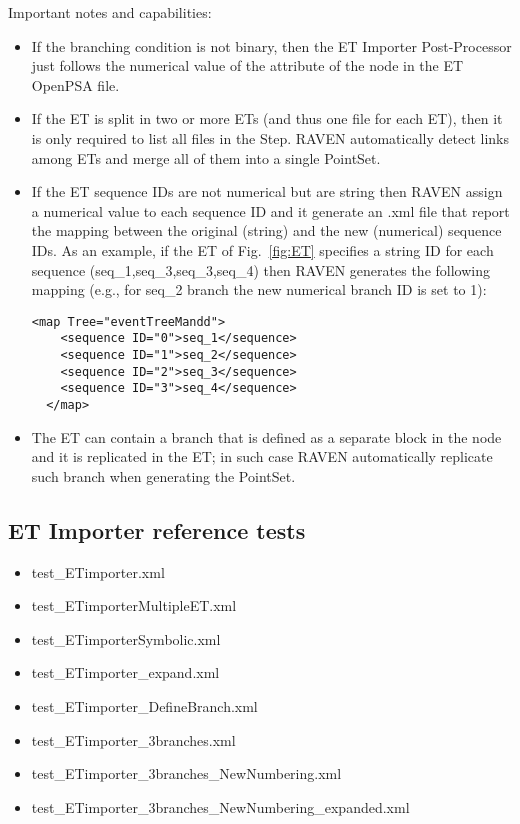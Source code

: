 Important notes and capabilities:
\begin{itemize}
	\item If the branching condition is not binary, then the ET Importer Post-Processor just follows 
	      the numerical value of the  attribute of the  node in the ET OpenPSA file. 
	\item If the ET is split in two or more ETs (and thus one file for each ET), then it is only required to list 
	      all files in the Step. RAVEN automatically detect links among ETs and merge all of them into a single PointSet.
	\item If the ET sequence IDs are not numerical but are string then RAVEN assign a numerical value to each sequence ID
	      and it generate an .xml file that report the mapping between the original (string) and the new (numerical) 
	      sequence IDs. As an example, if the ET of Fig.~\ref{fig:ET} specifies a string ID for each sequence 
	      (seq\_1,seq\_3,seq\_3,seq\_4) then RAVEN generates the following mapping (e.g., for seq\_2 branch the new 
	      numerical branch ID is set to 1):
\begin{lstlisting}[style=XML,morekeywords={anAttribute},caption=ET Importer mapping., label=lst:ET_PP_mapping]
  <map Tree="eventTreeMandd">
    <sequence ID="0">seq_1</sequence>
    <sequence ID="1">seq_2</sequence>
    <sequence ID="2">seq_3</sequence>
    <sequence ID="3">seq_4</sequence>
  </map>
\end{lstlisting}
    \item The ET can contain a branch that is defined as a separate block in the  node and it is 
          replicated in the ET; in such case RAVEN automatically replicate such branch when generating the PointSet. 
\end{itemize}
 

\subsection{ET Importer reference tests}
\begin{itemize}
	\item test\_ETimporter.xml
	\item test\_ETimporterMultipleET.xml
	\item test\_ETimporterSymbolic.xml
	\item test\_ETimporter\_expand.xml
	\item test\_ETimporter\_DefineBranch.xml
	\item test\_ETimporter\_3branches.xml
	\item test\_ETimporter\_3branches\_NewNumbering.xml
	\item test\_ETimporter\_3branches\_NewNumbering\_expanded.xml
\end{itemize}
